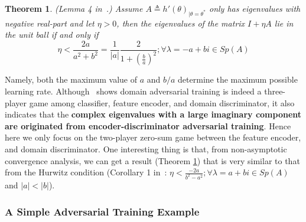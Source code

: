 \documentclass{article} \usepackage{iclr2023_conference,times}
\newtheorem{theo}{Theorem}
\begin{document}
\begin{theo}
(Lemma 4 in~\citep{mescheder2017numerics}.) Assume $A\triangleq h'(\theta)_{|\theta=\theta^*}$ only has eigenvalues with negative real-part and let $\eta>0$, then the eigenvalues of the matrix $I+\eta A$ lie in the unit ball if and only if
\begin{equation}
    \eta<\frac{2a}{a^2+b^2}=\frac{1}{|a|}\frac{2}{1+(\frac{b}{a})^2};\forall \lambda=-a+bi\in Sp(A)
\end{equation}
\label{theo:convergence2}
\end{theo}
Namely, both the maximum value of $a$ and $b/a$ determine the maximum possible learning rate. Although~\citep{acuna2021f} shows domain adversarial training is indeed a three-player game among classifier, feature encoder, and domain discriminator, it also indicates that the \textbf{complex eigenvalues with a large imaginary component are originated from encoder-discriminator adversarial training}.  Hence here we only focus on the two-player zero-sum game between the feature encoder, and domain discriminator. One interesting thing is that, from non-asymptotic convergence analysis, we can get a result (Theorem \ref{theo:convergence2}) that is very similar to that from the Hurwitz condition (Corollary 1 in~\citep{acuna2021f}: $\eta<\frac{-2a}{b^2-a^2};\forall \lambda=a+bi\in Sp(A)$ and $|a|<|b|$).


\subsubsection{A Simple Adversarial Training Example}
\end{document}
